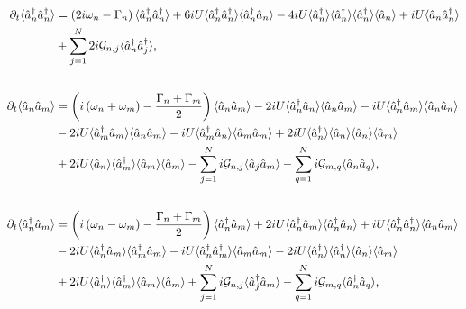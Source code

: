 \begin{align}
\partial_t\langle\hat{a}_n^\dagger\hat{a}_n^\dagger\rangle &= \left(2 i \omega_n - \Gamma_n  \right) \langle\hat{a}_n^\dagger\hat{a}_n^\dagger\rangle + 6 i U \langle\hat{a}_n^\dagger\hat{a}_n^\dagger\rangle\langle\hat{a}_n^\dagger \hat{a}_n\rangle - 4 i U \langle\hat{a}_n^\dagger\rangle\langle\hat{a}_n^\dagger\rangle\langle\hat{a}_n^\dagger\rangle\langle\hat{a}_n\rangle + i U \langle\hat{a}_n\hat{a}^\dagger_n\rangle  \notag \\
&+ \sum_{j=1}^N 2 i \mathcal{G}_{n, j} \langle\hat{a}_n^\dagger\hat{a}_j^\dagger\rangle, \notag \\[18pt]
%
%
\partial_t\langle\hat{a}_n\hat{a}_m\rangle &= \left(i\left(\omega_n + \omega_m\right) - \frac{\Gamma_n + \Gamma_m}{2}\right)\langle\hat{a}_n\hat{a}_m\rangle - 2 i U \langle\hat{a}_n^\dagger\hat{a}_n\rangle \langle\hat{a}_n\hat{a}_m\rangle - i U \langle\hat{a}_n^\dagger\hat{a}_m\rangle \langle\hat{a}_n\hat{a}_n\rangle \notag \\
& - 2 i U \langle\hat{a}_m^\dagger\hat{a}_m\rangle\langle\hat{a}_n\hat{a}_m\rangle - i U \langle\hat{a}_m^\dagger\hat{a}_n\rangle\langle\hat{a}_m\hat{a}_m\rangle + 2 i U \langle\hat{a}_n^\dagger\rangle \langle\hat{a}_n\rangle \langle\hat{a}_n\rangle \langle\hat{a}_m\rangle \notag \\
&+ 2 i U \langle\hat{a}_n\rangle \langle\hat{a}_m^\dagger\rangle \langle\hat{a}_m\rangle\langle\hat{a}_m\rangle %
 - \sum_{j=1}^N i \mathcal{G}_{n, j}\langle\hat{a}_j\hat{a}_m\rangle - \sum_{q=1}^N i \mathcal{G}_{m, q} \langle\hat{a}_n\hat{a}_q\rangle, \notag \\[18pt]
%
%
\partial_t\langle\hat{a}_n^\dagger\hat{a}_m\rangle &= \left(i\left(\omega_n - \omega_m\right) - \frac{\Gamma_n + \Gamma_m}{2}\right)\langle\hat{a}_n^\dagger\hat{a}_m\rangle + 2 i U \langle\hat{a}_n^\dagger\hat{a}_m \rangle \langle\hat{a}_n^\dagger \hat{a}_n\rangle + i U \langle \hat{a}_n^\dagger \hat{a}_n^\dagger\rangle\langle\hat{a}_n\hat{a}_m\rangle \notag \\
& - 2 i U \langle\hat{a}_n^\dagger \hat{a}_m \rangle \langle \hat{a}_m^\dagger \hat{a}_m\rangle - i U \langle\hat{a}_n^\dagger \hat{a}_m^\dagger\rangle \langle\hat{a}_m\hat{a}_m\rangle - 2 i U \langle\hat{a}_n^\dagger\rangle \langle\hat{a}_n^\dagger\rangle \langle\hat{a}_n\rangle \langle\hat{a}_m\rangle \notag \\
&+ 2 i U \langle\hat{a}_n^\dagger \rangle \langle \hat{a}_m^\dagger \rangle \langle \hat{a}_m\rangle \langle\hat{a}_m\rangle %
 + \sum_{j=1}^N i \mathcal{G}_{n, j}\langle\hat{a}_j^\dagger\hat{a}_m\rangle - \sum_{q=1}^N i \mathcal{G}_{m, q}\langle \hat{a}_n^\dagger \hat{a}_q\rangle,  \notag %
%
\end{align}
